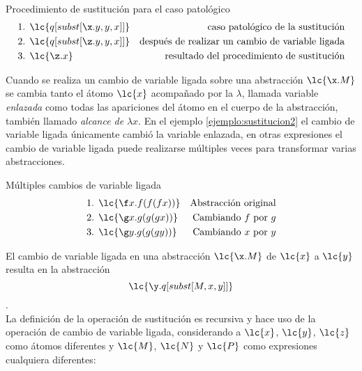 \begin{ejemplo} Procedimiento de sustitución para el caso patológico
  \label{ejemplo:sustitucion2}
  \begin{align*}
    \text{1. } &\lc{q[subst[\x.y,y,x]]} &\text{caso patológico de la sustitución} \\
    \text{2. } &\lc{q[subst[\z.y,y,x]]} &\text{después de realizar un cambio de variable ligada} \\
    \text{3. } &\lc{\z.x}               &\text{resultado del procedimiento de sustitución}
  \end{align*}
\end{ejemplo}

Cuando se realiza un cambio de variable ligada sobre una abstracción
\(\lc{\x.M}\) se cambia tanto el átomo \(\lc{x}\) acompañado por la \(\lambda\),
llamada variable \emph{enlazada} como todas las apariciones del átomo en el
cuerpo de la abstracción, también llamado \emph{alcance de} \(\lambda x\). En el
ejemplo \ref{ejemplo:sustitucion2} el cambio de variable ligada únicamente
cambió la variable enlazada, en otras expresiones el cambio de variable ligada
puede realizarse múltiples veces para transformar varias abstracciones. \\

\begin{ejemplo} Múltiples cambios de variable ligada
  \label{ejemplo:variableligada1}
  \begin{align*}
    \text{1. } &\lc{\f x.f(f(f x))} &\text{Abstracción original} \\
    \text{2. } &\lc{\g x.g(g(g x))} &\text{Cambiando \(f\) por \(g\)} \\
    \text{3. } &\lc{\g y.g(g(g y))} &\text{Cambiando \(x\) por \(y\)}
  \end{align*}
\end{ejemplo}

El cambio de variable ligada en una abstracción \(\lc{\x.M}\) de \(\lc{x}\) a
\(\lc{y}\) resulta en la abstracción \[\lc{\y.q[subst[M,x,y]]}\]. \\

La definición de la operación de sustitución es recursiva y hace uso de la
operación de cambio de variable ligada, considerando a \(\lc{x}\), \(\lc{y}\),
\(\lc{z}\) como átomos diferentes y \(\lc{M}\), \(\lc{N}\) y \(\lc{P}\) como
expresiones cualquiera diferentes:

